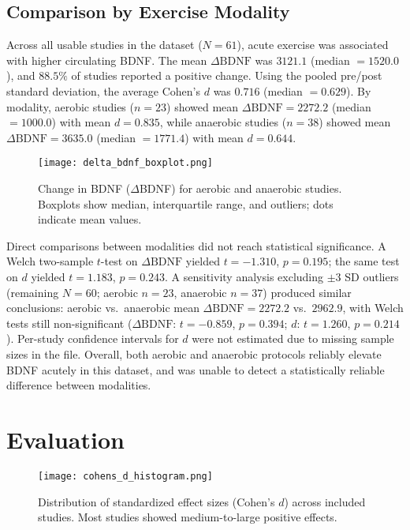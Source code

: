 \documentclass[runningheads]{llncs}
\begin{document}
\subsection{Comparison by Exercise Modality}
Across all usable studies in the dataset (\(N=61\)), acute exercise was associated with higher circulating BDNF. The mean \(\Delta\text{BDNF}\) was \(3121.1\) (median \(= 1520.0\)), and \(88.5\%\) of studies reported a positive change. Using the pooled pre/post standard deviation, the average Cohen’s \(d\) was \(0.716\) (median \(= 0.629\)). By modality, aerobic studies (\(n=23\)) showed mean \(\Delta\text{BDNF} = 2272.2\) (median \(= 1000.0\)) with mean \(d = 0.835\), while anaerobic studies (\(n=38\)) showed mean \(\Delta\text{BDNF} = 3635.0\) (median \(= 1771.4\)) with mean \(d = 0.644\).

\begin{figure}[ht]
    \centering
    \texttt{[image: delta\_bdnf\_boxplot.png]}
    \caption{Change in BDNF ($\Delta$BDNF) for aerobic and anaerobic studies. 
    Boxplots show median, interquartile range, and outliers; dots indicate mean values.}
    \label{fig:delta_bdnf_boxplot}
\end{figure}


Direct comparisons between modalities did not reach statistical significance. A Welch two-sample \(t\)-test on \(\Delta\text{BDNF}\) yielded \(t = -1.310\), \(p = 0.195\); the same test on \(d\) yielded \(t = 1.183\), \(p = 0.243\). A sensitivity analysis excluding \(\pm 3\) SD outliers (remaining \(N=60\); aerobic \(n=23\), anaerobic \(n=37\)) produced similar conclusions: aerobic vs.\ anaerobic mean \(\Delta\text{BDNF} = 2272.2\) vs.\ \(2962.9\), with Welch tests still non-significant (\(\Delta\text{BDNF}\): \(t = -0.859\), \(p = 0.394\); \(d\): \(t = 1.260\), \(p = 0.214\)). Per-study confidence intervals for \(d\) were not estimated due to missing sample sizes in the file. Overall, both aerobic and anaerobic protocols reliably elevate BDNF acutely in this dataset, and was unable to detect a statistically reliable difference between modalities.

\section{Evaluation}

\begin{figure}[ht]
    \centering
    \texttt{[image: cohens\_d\_histogram.png]}
    \caption{Distribution of standardized effect sizes (Cohen’s $d$) across included studies. 
    Most studies showed medium-to-large positive effects.}
    \label{fig:cohens_d_hist}
\end{figure}
\end{document}
